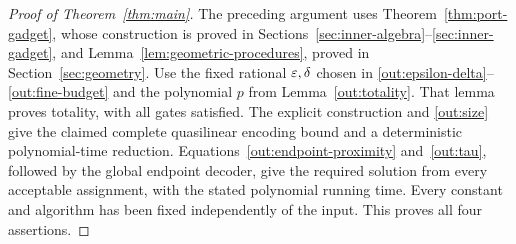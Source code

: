 \begin{proof}[Proof of Theorem~\ref{thm:main}]
The preceding argument uses Theorem~\ref{thm:port-gadget}, whose construction
is proved in Sections~\ref{sec:inner-algebra}--\ref{sec:inner-gadget}, and
Lemma~\ref{lem:geometric-procedures}, proved in Section~\ref{sec:geometry}.
Use the fixed rational $\varepsilon,\delta$ chosen in
\eqref{out:epsilon-delta}--\eqref{out:fine-budget} and the polynomial
$p$ from Lemma~\ref{out:totality}. That lemma proves totality, with all
gates satisfied. The explicit construction and \eqref{out:size} give
the claimed complete quasilinear encoding bound and a deterministic
polynomial-time reduction. Equations~\eqref{out:endpoint-proximity}
and~\eqref{out:tau}, followed by the global endpoint decoder, give the
required solution from every acceptable assignment, with the stated
polynomial running time. Every constant and algorithm has been fixed
independently of the input. This proves all four assertions.
\end{proof}
